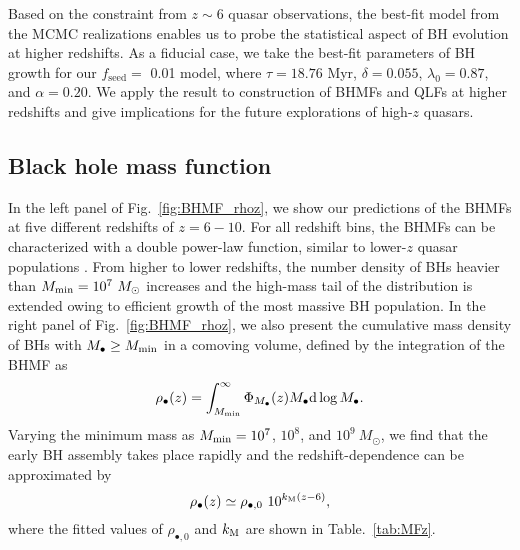 \documentclass[twocolumn, twocolappendix]{aastex63}
\newcommand{\Msun}{M_\odot}
\newcommand{\Mbh}{M_\bullet}
\newcommand{\tlife}{\tau}
\newcommand{\fseed}{f_\mathrm{seed}}
\newcommand{\D}{\mathrm{d}}
\begin{document}
\begin{CJK*}{UTF8}{gbsn}
Based on the constraint from $z\sim 6$ quasar observations, the best-fit model from the MCMC realizations enables
us to probe the statistical aspect of BH evolution at higher redshifts.
As a fiducial case, we take the best-fit parameters of BH growth for our $\fseed=$ 0.01 model,
where $\tlife=18.76$ Myr, $\delta=0.055$, $\lambda_0=0.87$, and $\alpha=0.20$.
We apply the result to construction of BHMFs and QLFs at higher redshifts and give implications for
the future explorations of high-$z$ quasars.



\subsection{Black hole mass function}

In the left panel of Fig.~\ref{fig:BHMF_rhoz}, we show our predictions of the BHMFs at five different redshifts of $z=6-10$.
For all redshift bins, the BHMFs can be characterized with a double power-law function, similar to lower-$z$ quasar populations
\citep[e.g.,][]{2013ApJ...764...45K,2015MNRAS.447.2085S}.
From higher to lower redshifts, the number density of BHs heavier than $M_{\rm min} = 10^7~\Msun$ increases
and the high-mass tail of the distribution is extended owing to efficient growth of the most massive BH population.
In the right panel of Fig.~\ref{fig:BHMF_rhoz}, we also present the cumulative mass density of BHs with $\Mbh \geq M_{\rm min}$ in a comoving volume,
defined by the integration of the BHMF as
%
\begin{equation}
 \rho_\bullet(z)=\int_{M_{\rm min}}^{\infty} \Phi_{\Mbh} (z) \Mbh \D \log \Mbh.
\end{equation}
%
Varying the minimum mass as $M_{\rm min}=10^7$, $10^8$, and $10^9~\Msun$,
we find that the early BH assembly takes place rapidly and the redshift-dependence can be approximated by
%
\begin{equation}
\rho_\bullet(z)
\simeq \rho_{\bullet,0}~ 10^{k_{\rm M}(z-6)},
\end{equation}
%
where the fitted values of $\rho_{\bullet,0}$ and $k_{\rm M}$ are shown in Table.~\ref{tab:MFz}.


\end{CJK*}
\end{document}
